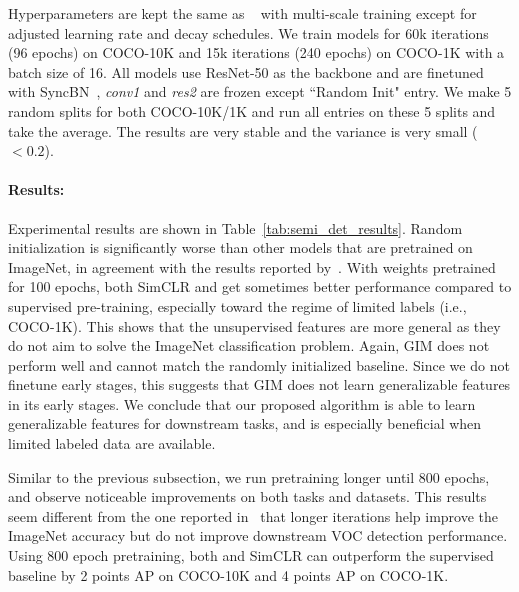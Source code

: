 Hyperparameters are kept the same as ~\cite{he2019rethinking} with multi-scale training except for
adjusted learning rate and decay schedules. We train models for 60k iterations (96 epochs) on
COCO-10K and 15k iterations (240 epochs) on COCO-1K with a batch size of 16. All models use
ResNet-50 as the backbone and are finetuned with SyncBN~\cite{peng2018megdet}, {\em conv1} and {\em
res2} are frozen except ``Random Init" entry. We make 5 random splits for both COCO-10K/1K and run
all entries on these 5 splits and take the average. The results are very stable and the variance is
very small ($<0.2$).

\paragraph{Results:} 
Experimental results are shown in Table~\ref{tab:semi_det_results}. Random initialization is
significantly worse than other models that are pretrained on ImageNet, in agreement with the results
reported by~\cite{he2019rethinking}. With weights pretrained for 100 epochs, both SimCLR and \ours{}
get sometimes better performance compared to supervised pre-training, especially toward the regime
of limited labels (i.e., COCO-1K). This shows that the unsupervised features are more general as
they do not aim to solve the ImageNet classification problem. Again, GIM does not perform well and
cannot match the randomly initialized baseline. Since we do not finetune early stages, this suggests
that GIM does not learn generalizable features in its early stages. We conclude that our proposed
{\ours} algorithm is able to learn generalizable features for downstream tasks, and is especially
beneficial when limited labeled data are available.

Similar to the previous subsection, we run pretraining longer until 800 epochs, and observe
noticeable improvements on both tasks and datasets. This results seem different from the one
reported in~\cite{chen2020improved} that longer iterations help improve the ImageNet accuracy but do
not improve downstream VOC detection performance. Using 800 epoch pretraining, both \ours{} and
SimCLR can outperform the supervised baseline by 2 points AP on COCO-10K and 4 points AP on COCO-1K.

